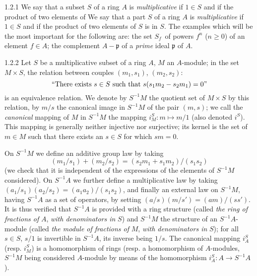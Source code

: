 
\begin{env}{1.2.1}
\label{0.1.2.1}
We say that a subset $S$ of a ring $A$ is \emph{multiplicative} if $1\in S$ and if the product of two elements of
We say that a part $S$ of a ring $A$ is \emph{multiplicative} if $1\in S$ and if the product of two elements of
$S$ is in $S$. The examples which will be the most important for the following are:
 the set $S_f$ of powers $f^n$ ($n\geq 0$) of an element $f\in A$;
 the complement $A-\mathfrak{p}$ of a \emph{prime} ideal $\mathfrak{p}$ of $A$.
\end{env}

\begin{env}{1.2.2}
\label{0.1.2.2}
Let $S$ be a multiplicative subset of a ring $A$, $M$ an $A$-module; in the set $M\times S$, the relation between
couples $(m_1,s_1)$, $(m_2,s_2)$:
\[
   ``\text{There exists } s\in S\text{ such that } s(s_1 m_2-s_2 m_1)=0"
\]
is an equivalence relation. We denote by $S^{-1}M$ the quotient set of $M\times S$ by this relation, by $m/s$ the canonical
image in $S^{-1}M$ of the pair $(m,s)$; we call the \emph{canonical} mapping of $M$ in $S^{-1}M$ the mapping $i_M^S\colon m\mapsto m/1$
(also denoted $i^S$). This mapping is generally neither injective nor surjective; its kernel is the set of $m\in M$ such that there
exists an $s\in S$ for which $sm=0$.

On $S^{-1}M$ we define an additive group law by taking
\[
  (m_1/s_1)+(m_2/s_2)=(s_2 m_1+s_1 m_2)/(s_1 s_2)
\]
(we check that it is independent of the expressions of the elements of $S^{-1}M$ considered). On $S^{-1}A$ we further define
a multiplicative law by taking $(a_1/s_1)(a_2/s_2)=(a_1 a_2)/(s_1 s_2)$, and finally an external law on $S^{-1}M$, having
$S^{-1}A$ as a set of operators, by setting $(a/s)(m/s')=(am)/(ss')$. It is thus verified that $S^{-1}A$ is provided with a
ring structure (called \emph{the ring of fractions of} $A$, \emph{with denominators in} $S$) and $S^{-1}M$ the structure of
an $S^{-1}A$-module (called \emph{the  module of fractions of} $M$, \emph{with denominators in} $S$); for all $s\in S$,
$s/1$ is invertible in $S^{-1}A$, its inverse being $1/s$. The canonical mapping $i_A^S$ (resp. $i_M^S$) is a homomorphism
of rings (resp. a homomorphism of $A$-modules, $S^{-1}M$ being considered $A$-module by means of the homomorphism
$i_A^S\colon A\to S^{-1}A$).
\end{env}

